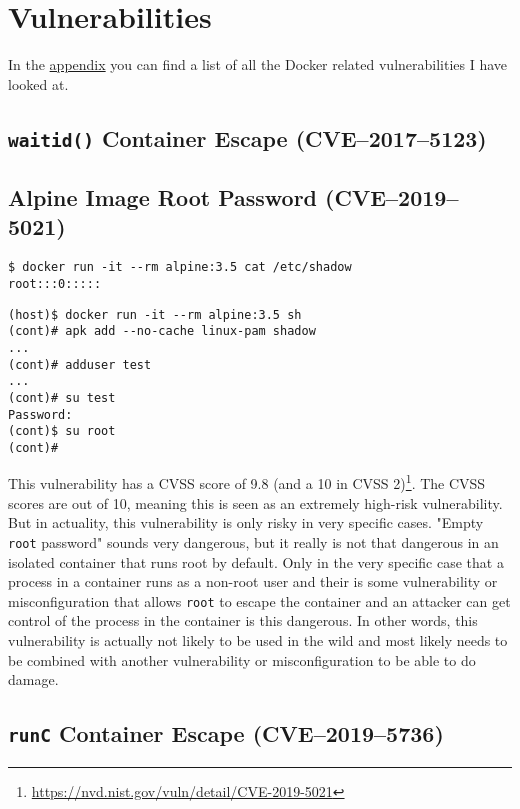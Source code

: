 \section{Vulnerabilities}

In the \hyperref[appendix:CVE-List]{appendix} you can find a list of all the Docker related vulnerabilities I have looked at.

\subsection{\texorpdfstring{\lstinline{waitid()}}{waitid()} Container Escape (CVE--2017--5123)}

\subsection{Alpine Image Root Password (CVE--2019--5021)}
\begin{lstlisting}
$ docker run -it --rm alpine:3.5 cat /etc/shadow
root:::0:::::
\end{lstlisting}

\begin{lstlisting}
(host)$ docker run -it --rm alpine:3.5 sh
(cont)# apk add --no-cache linux-pam shadow
...
(cont)# adduser test
...
(cont)# su test
Password:
(cont)$ su root
(cont)#
\end{lstlisting}

This vulnerability has a CVSS score of 9.8 (and a 10 in CVSS 2)\footnote{\url{https://nvd.nist.gov/vuln/detail/CVE-2019-5021}}. The CVSS scores are out of 10, meaning this is seen as an extremely high-risk vulnerability. But in actuality, this vulnerability is only risky in very specific cases. "Empty \lstinline{root} password" sounds very dangerous, but it really is not that dangerous in an isolated container that runs root by default. Only in the very specific case that a process in a container runs as a non-root user and their is some vulnerability or misconfiguration that allows \lstinline{root} to escape the container and an attacker can get control of the process in the container is this dangerous. In other words, this vulnerability is actually not likely to be used in the wild and most likely needs to be combined with another vulnerability or misconfiguration to be able to do damage.

\subsection{\texorpdfstring{\lstinline{runC}}{runC} Container Escape (CVE--2019--5736)}
